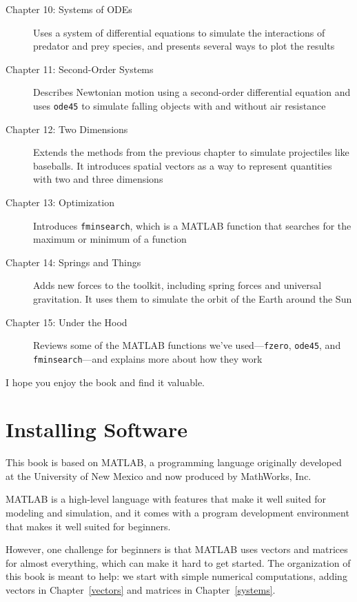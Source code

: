 \begin{description}
\item [Chapter 10: Systems of ODEs] Uses a system of differential equations to simulate the interactions of predator and prey species, and presents several ways to plot the results

\item [Chapter 11: Second-Order Systems] Describes Newtonian motion using a second-order differential equation and uses \lstinline{ode45} to simulate falling objects with and without air resistance

\item [Chapter 12: Two Dimensions] Extends the methods from the previous chapter to simulate projectiles like baseballs.  It introduces spatial vectors as a way to represent quantities with two and three dimensions

\item [Chapter 13: Optimization] Introduces \lstinline{fminsearch}, which is a MATLAB function that searches for the maximum or minimum of a function

\item [Chapter 14: Springs and Things] Adds new forces to the toolkit, including spring forces and universal gravitation.  It uses them to simulate the orbit of the Earth around the Sun

\item [Chapter 15: Under the Hood] Reviews some of the MATLAB functions we've used---\lstinline{fzero}, \lstinline{ode45}, and \lstinline{fminsearch}---and explains more about how they work

\end{description}

I hope you enjoy the book and find it valuable.


\section*{Installing Software}

This book is based on MATLAB, a programming language originally developed at the University of New Mexico and now produced by MathWorks, Inc.

MATLAB is a high-level language with features that make it well suited for modeling and simulation, and it comes with a program development environment that makes it well suited for beginners.

However, one challenge for beginners is that MATLAB uses vectors and matrices for almost everything, which can make it hard to get started.  The organization of this book is meant to help: we start with simple numerical computations, adding vectors in Chapter~\ref{vectors} and matrices in Chapter~\ref{systems}.


